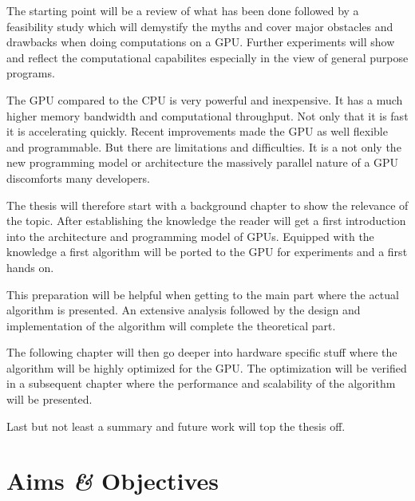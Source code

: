 
The starting point will be a review of what has been done followed by a
feasibility study which will demystify the myths and cover major obstacles and
drawbacks when doing computations on a \gls{GPU}. Further experiments will show
and reflect the computational capabilites especially in the view of general 
purpose programs. 


The \gls{GPU} compared to the \gls{CPU} is very powerful and inexpensive. It has
a much higher memory bandwidth and computational throughput. Not only that it is
fast it is accelerating quickly. Recent improvements made the \gls{GPU} as well
flexible and programmable. But there are limitations and difficulties. It is a not
only the new programming model or architecture the massively parallel nature of 
a \gls{GPU} discomforts many developers. 


The thesis will therefore start with a background chapter to show the relevance
of the topic. After establishing the knowledge the reader will get a first
introduction into the architecture and programming model of \glspl{GPU}.
Equipped with the knowledge a first algorithm will be ported to the \gls{GPU}
for experiments and a first hands on.

This preparation will be helpful when getting to the main part where the actual
algorithm is presented. An extensive analysis followed by the design and implementation
of the algorithm will complete the theoretical part. 

The following chapter will then go deeper into hardware specific stuff where the
algorithm will be highly optimized for the \gls{GPU}. The optimization will be 
verified in a subsequent chapter where the performance and scalability of the
algorithm will be presented. 

Last but not least a summary and future work will top the thesis off. 

\section{Aims \textit{\&} Objectives} %
\label{sec:aims_objectives}

